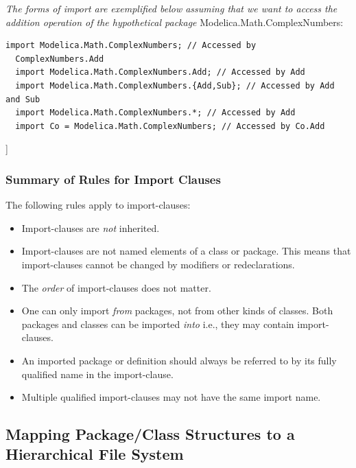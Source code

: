 \documentclass[10pt,a4paper]{report}
\def\doublelabel#1{\label{#1}\hypertarget{#1}{}}
\begin{document}
\emph{The forms of import are exemplified below assuming that we want to
access the addition operation of the hypothetical package}
Modelica.Math.ComplexNumbers:

\begin{lstlisting}[language=modelica]
  import Modelica.Math.ComplexNumbers; // Accessed by
  ComplexNumbers.Add
  import Modelica.Math.ComplexNumbers.Add; // Accessed by Add
  import Modelica.Math.ComplexNumbers.{Add,Sub}; // Accessed by Add and Sub
  import Modelica.Math.ComplexNumbers.*; // Accessed by Add
  import Co = Modelica.Math.ComplexNumbers; // Accessed by Co.Add
\end{lstlisting}
{]}

\subsubsection{Summary of Rules for Import Clauses}\doublelabel{summary-of-rules-for-import-clauses}

The following rules apply to import-clauses:

\begin{itemize}
\item
  Import-clauses are \emph{not} inherited.
\end{itemize}

\begin{itemize}
\item
  Import-clauses are not named elements of a class or package. This
  means that import-clauses cannot be changed by modifiers or
  redeclarations.
\item
  The \emph{order} of import-clauses does not matter.
\item
  One can only import \emph{from} packages, not from other kinds of
  classes. Both packages and classes can be imported \emph{into} i.e.,
  they may contain import-clauses.
\item
  An imported package or definition should always be referred to by its
  fully qualified name in the import-clause.
\item
  Multiple qualified import-clauses may not have the same import name.
\end{itemize}

\subsection{Mapping Package/Class Structures to a Hierarchical File System}\doublelabel{mapping-package-class-structures-to-a-hierarchical-file-system}
\end{document}
